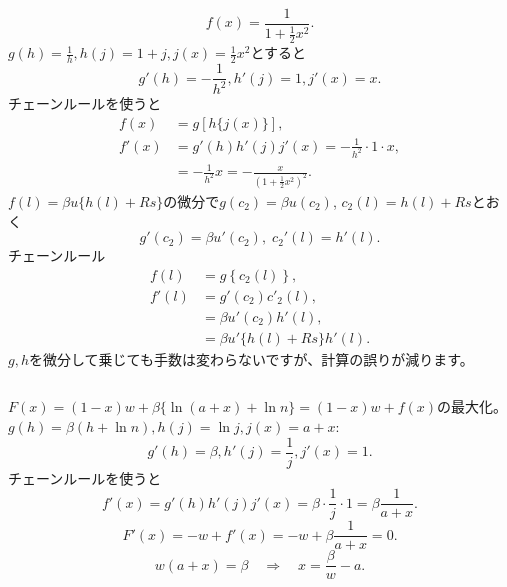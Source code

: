 \begin{frame}[t]{}
\begin{columns}[T]
\[
f(x)=\frac{1}{1+\frac{1}{2}x^{2}}.
\]
$g(h)=\frac{1}{h}, h(j)=1+j, j(x)=\frac{1}{2}x^{2}$とすると
\[
g'(h)=-\frac{1}{h^{2}}, h'(j)=1, j'(x)=x.
\]
チェーンルールを使うと
\[
\begin{aligned}
f(x)
&=
g\left[h\{j(x)\}\right],\\
f'(x)
&=
g'(h)h'(j)j'(x)=-\frac{1}{h^{2}}\cdot 1\cdot x,\\
&=-\frac{1}{h^{2}}x=-\frac{x}{\left(1+\frac{1}{2}x^{2}\right)^{2}}.
\end{aligned}
\]
$f(l)=\beta u\{h(l)+Rs\}$の微分で$g(c_{2})=\beta u(c_{2})$, $c_{2}(l)=h(l)+Rs$とおく
\[
g'(c_{2})=\beta u'(c_{2}), \; c_{2}'(l)=h'(l).
\]
チェーンルール
\[
\begin{aligned}
f(l)
&=
g\left\{c_{2}(l)\right\},\\
f'(l)
&=
g'(c_{2})c'_{2}(l),\\
&=
\beta u'(c_{2})h'(l),\\
&=
\beta u'\{h(l)+Rs\}h'(l).
\end{aligned}
\]
\pause
$g, h$を微分して乗じても手数は変わらないですが、計算の誤りが減ります。
\end{columns}
\end{frame}

\begin{frame}[t]{}
\begin{columns}[T]
$F(x)=(1-x)w+\beta \{\ln (a+x)+\ln n\}=(1-x)w+f(x)$の最大化。$g(h)=\beta (h+\ln n), h(j)=\ln j, j(x)=a+x$:
\[
g'(h)=\beta, h'(j)=\frac{1}{j}, j'(x)=1.
\]
チェーンルールを使うと
\[
f'(x)=g'(h)h'(j)j'(x)=\beta\cdot \frac{1}{j}\cdot 1=\beta\frac{1}{a+x}.
\]
\[
F'(x)=-w+f'(x)=-w+\beta\frac{1}{a+x}=0.
\]
\[
w(a+x)=\beta \quad \Rightarrow \quad x=\frac{\beta}{w}-a.
\]
\end{columns}

\end{frame}

